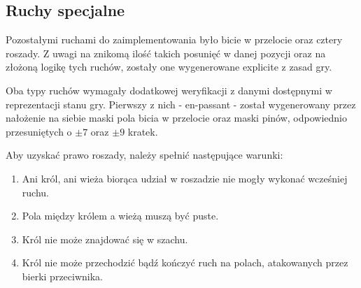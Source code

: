 \subsection{Ruchy specjalne}
\label{subsec:ruchy-specjalne}

Pozostałymi ruchami do zaimplementowania było bicie w przelocie oraz cztery roszady.
Z uwagi na znikomą ilość takich posunięć w danej pozycji oraz na złożoną logikę tych ruchów, zostały one wygenerowane explicite z zasad gry.

Oba typy ruchów wymagały dodatkowej weryfikacji z danymi dostępnymi w reprezentacji stanu gry.
Pierwszy z nich - en-passant - został wygenerowany przez nałożenie na siebie maski pola bicia w przelocie oraz maski pinów, odpowiednio przesuniętych o $\pm 7$ oraz $\pm 9$ kratek.

Aby uzyskać prawo roszady, należy spełnić następujące warunki:
\begin{enumerate}
    \item Ani król, ani wieża biorąca udział w roszadzie nie mogły wykonać wcześniej ruchu.
    \item Pola między królem a wieżą muszą być puste.
    \item Król nie może znajdować się w szachu.
    \item Król nie może przechodzić bądź kończyć ruch na polach, atakowanych przez bierki przeciwnika.
\end{enumerate}



